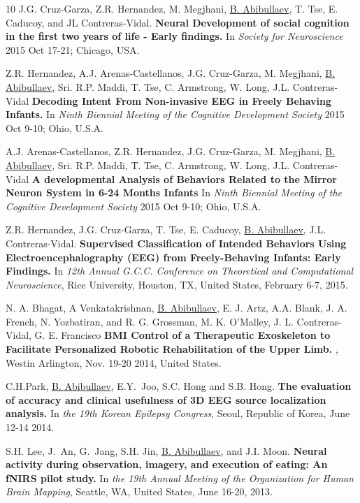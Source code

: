 \documentclass[10pt,letterpaper,sans]{moderncv}   %
\begin{document}
\begin{thebibliography}{10}
	\small
	J.G. Cruz-Garza, Z.R. Hernandez, M. Megjhani, \underline{B. Abibullaev}, T. Tse, E. Caducoy, and JL Contreras-Vidal.
	\newblock \textbf{Neural Development of social cognition in the first two years of life - Early findings.}
	\newblock In {\em Society for Neuroscience} 2015 Oct 17-21; Chicago, USA.
	
	Z.R. Hernandez, A.J. Arenas-Castellanos, J.G. Cruz-Garza, M. Megjhani, \underline{B. Abibullaev}, Sri. R.P. Maddi, T. Tse,  C. Armstrong, W. Long, J.L. Contreras-Vidal
	\newblock \textbf{Decoding Intent From Non-invasive {EEG} in Freely Behaving Infants.}
	\newblock In {\em Ninth Biennial Meeting of the Cognitive Development Society} 2015 Oct 9-10; Ohio, U.S.A.
	
	A.J. Arenas-Castellanos, Z.R. Hernandez, J.G. Cruz-Garza, M. Megjhani, \underline{B. Abibullaev}, Sri. R.P. Maddi, T. Tse,  C. Armstrong, W. Long, J.L. Contreras-Vidal
	\newblock \textbf{A developmental Analysis of Behaviors Related to the Mirror Neuron System in 6-24 Months Infants}
	\newblock In {\em Ninth Biennial Meeting of the Cognitive Development Society} 2015 Oct 9-10; Ohio, U.S.A.
	
	Z.R. Hernandez, J.G. Cruz-Garza, T. Tse, E. Caducoy, \underline{B. Abibullaev}, J.L. Contreras-Vidal.
	\newblock \textbf{Supervised Classification of Intended Behaviors Using Electroencephalography ({EEG}) from Freely-Behaving Infants: Early Findings.}
	\newblock In {\em 12th Annual G.C.C. Conference on Theoretical and Computational Neuroscience}, Rice University, Houston, TX, United States, February 6-7, 2015.
	
	N. A. Bhagat, A Venkatakrishnan, \underline{B. Abibullaev}, E. J. Artz, A.A. Blank, J. A. French, N. Yozbatiran, and R. G. Grossman, M. K. O'Malley, J. L. Contreras-Vidal, G. E. Francisco
	\newblock \textbf{{BMI} Control of a Therapeutic Exoskeleton to Facilitate Personalized Robotic Rehabilitation of the Upper Limb.}
	, Westin Arlington, Nov. 19-20 2014, United States.  
	
	C.H.Park,  \underline{B. Abibullaev}, E.Y.~Joo, S.C. Hong and S.B. Hong.
	\newblock \textbf{The evaluation of accuracy and clinical usefulness of 3D {EEG} source localization analysis.}
	\newblock In {\em the 19th Korean Epilepsy Congress}, Seoul, Republic of Korea, June 12-14 2014.
	
	S.H. Lee, J.~An, G.~Jang, S.H. Jin, \underline{B. Abibullaev}, and J.I. Moon.
	\newblock \textbf{Neural activity during observation, imagery, and execution of eating: An {fNIRS} pilot study.}
	\newblock In {\em the 19th Annual Meeting of the Organization for Human Brain
			Mapping}, Seattle, WA, United States, June 16-20, 2013.
	

\end{thebibliography}
\end{document}

